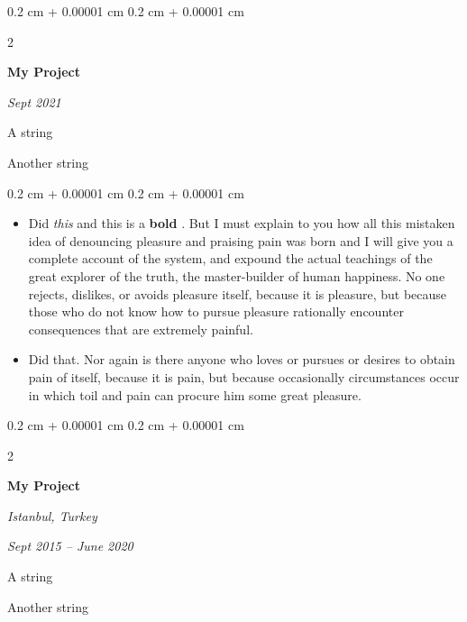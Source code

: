 \documentclass[10pt, letterpaper]{article}
\newenvironment{summary}{
    \begin{description}[
        topsep=0.10 cm,
        parsep=0.10 cm,
        partopsep=0pt,
        itemsep=0pt,
        leftmargin=0.4 cm + 10pt
    ]
}{
    \end{description}
} %
\newenvironment{highlights}{
    \begin{itemize}[
        topsep=0.10 cm,
        parsep=0.10 cm,
        partopsep=0pt,
        itemsep=0pt,
        leftmargin=0.4 cm + 10pt
    ]
}{
    \end{itemize}
} %
\newenvironment{onecolentry}{
    \begin{adjustwidth}{
        0.2 cm + 0.00001 cm
    }{
        0.2 cm + 0.00001 cm
    }
}{
    \end{adjustwidth}
} %
\newenvironment{twocolentry}[2][]{
    \onecolentry
    \def\secondColumn{#2}
    \setcolumnwidth{\fill, 4.5 cm}
    \begin{paracol}{2}
}{
    \switchcolumn \raggedleft \secondColumn
    \end{paracol}
    \endonecolentry
} %
\let\hrefWithoutArrow\href
\renewcommand{\href}[2]{\hrefWithoutArrow{#1}{\ifthenelse{\equal{#2}{}}{ }{#2 }\raisebox{.15ex}{\footnotesize \faExternalLink*}}}
\begin{document}
        \begin{twocolentry}{
            
            
        \textit{Sept 2021}}
            \textbf{My Project}
        \end{twocolentry}
            \begin{summary}
                \item A string
                \item Another string
            \end{summary}
        \vspace{0.10 cm}
        \begin{onecolentry}
            \begin{highlights}
                \item Did \textit{this} and this is a \textbf{bold} \href{https://example.com}{link}. But I must explain to you how all this mistaken idea of denouncing pleasure and praising pain was born and I will give you a complete account of the system, and expound the actual teachings of the great explorer of the truth, the master-builder of human happiness. No one rejects, dislikes, or avoids pleasure itself, because it is pleasure, but because those who do not know how to pursue pleasure rationally encounter consequences that are extremely painful.
                \item Did that. Nor again is there anyone who loves or pursues or desires to obtain pain of itself, because it is pain, but because occasionally circumstances occur in which toil and pain can procure him some great pleasure.
            \end{highlights}
        \end{onecolentry}


        \vspace{0.2 cm}

        \begin{twocolentry}{
        \textit{Istanbul, Turkey}    
            
        \textit{Sept 2015 – June 2020}}
            \textbf{My Project}
        \end{twocolentry}
            \begin{summary}
                \item A string
                \item Another string
            \end{summary}


        \vspace{0.2 cm}
\end{document}

